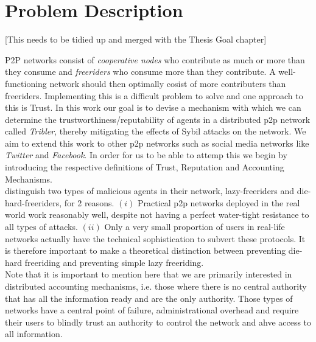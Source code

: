 \documentclass[11pt,a4paper]{report}
\theoremstyle{definition}
\theoremstyle{theorem}
\theoremstyle{proposition}
\theoremstyle{corollary}
\theoremstyle{lemma}
\theoremstyle{example}
\theoremstyle{remark}
\begin{document}
\section{Problem Description}
\label{sec:Problem Description}
\noindent{} \begin{center} [This needs to be tidied up and merged with the Thesis Goal chapter] \vspace{1em}\\ \end{center}
\noindent{}P2P networks consist of {\it cooperative nodes} who contribute as much or more than they consume and {\it freeriders} who consume more than they contribute. A well-functioning network should then optimally cosist of more contributers than freeriders. Implementing this is a difficult problem to solve and one approach to this is Trust. In this work our goal is to devise a mechanism with which we can determine the trustworthiness/reputability of agents in a distributed p2p network called {\it Tribler}, thereby mitigating the effects of Sybil attacks on the network. We aim to extend this work to other p2p networks such as social media networks like {\it Twitter} and {\it Facebook}. In order for us to be able to attemp this we begin by introducing the respective definitions of Trust, Reputation and Accounting Mechanisms. \vspace{1em}\\

\noindent{}\cite{Bartercast: A Practical Approach to Prevent Lazy Freeriding in P2P Networks} distinguish two types of malicious agents in their network, lazy-freeriders and die-hard-freeriders, for 2 reasons. $(i)$ Practical p2p networks deployed in the real world work reasonably well, despite not having a perfect water-tight resistance to all types of attacks. $(ii)$ Only a very small proportion of users in real-life networks actually have the technical sophistication to subvert these protocols. It is therefore important to make a theoretical distinction between preventing die-hard freeriding and preventing simple lazy freeriding. \vspace{1em}\\

\noindent{}Note that it is important to mention here that we are primarily interested in distributed accounting mechanisms, i.e. those where there is no central authority that has all the information ready and are the only authority. Those types of networks have a central point of failure, administrational overhead and require their users to blindly trust an authority to control the network and ahve access to all information. \vspace{1em}\\  
\end{document}

